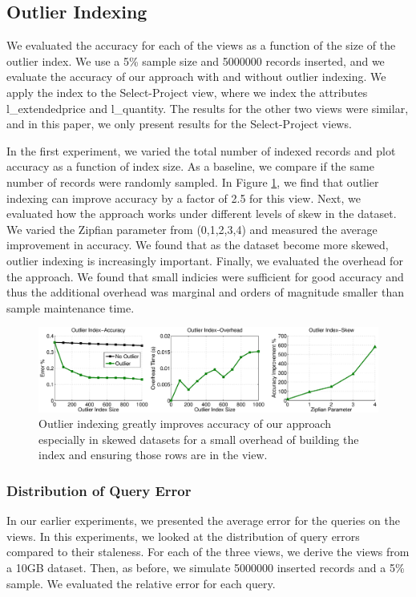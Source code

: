\subsection{Outlier Indexing}
We evaluated the accuracy for each of the views as a function of the size of the outlier index. 
We use a 5\% sample size and 5000000 records inserted, and we evaluate the accuracy of our approach with and without outlier indexing.
We apply the index to the Select-Project view, where we index the attributes l\_extendedprice and l\_quantity.
The results for the other two views were similar, and in this paper, we only present results for the Select-Project views.

In the first experiment, we varied the total number of indexed records and plot accuracy as a function of index size.
As a baseline, we compare if the same number of records were randomly sampled.
In Figure \ref{exp7outlier}, we find that outlier indexing can improve accuracy by a factor of 2.5 for this view. 
Next, we evaluated how the approach works under different levels of skew in the dataset. 
We varied the Zipfian parameter from (0,1,2,3,4) and measured the average improvement in accuracy. 
We found that as the dataset become more skewed, outlier indexing is increasingly important.
Finally, we evaluated the overhead for the approach. 
We found that small indicies were sufficient for good accuracy and thus the additional overhead was marginal and orders of magnitude smaller than sample maintenance time.

\begin{figure}[ht!]
\label{exp7outlier}
\hspace{-4em}
\includegraphics[scale=0.21]{exp/exp6-outlier-full.eps}
 \caption{Outlier indexing greatly improves accuracy of our approach especially in skewed datasets for a small overhead of building the index and ensuring those rows are in the view.}
\end{figure}

\subsubsection{Distribution of Query Error}
In our earlier experiments, we presented the average error for the queries on the views.
In this experiments, we looked at the distribution of query errors compared to their staleness.
For each of the three views, we derive the views from a 10GB dataset.
Then, as before, we simulate 5000000 inserted records and a 5\% sample.
We evaluated the relative error for each query.

